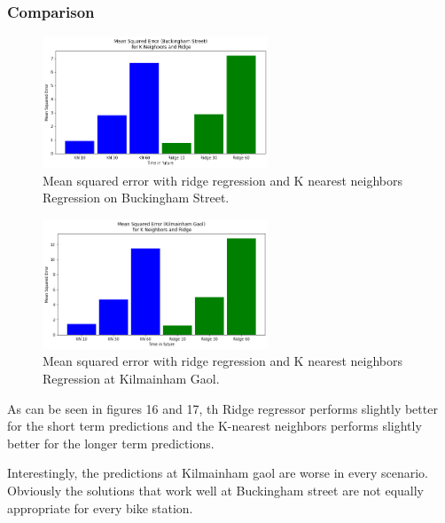 \subsubsection{Comparison}
\begin{figure}[H]
    \centering
    \includegraphics[width=0.6\textwidth]{images/mse5.png}
    \caption{Mean squared error with ridge regression and K nearest neighbors Regression  on Buckingham Street.}
    \end{figure}
\par

\begin{figure}[H]
    \centering
    \includegraphics[width=0.6\textwidth]{images/mse6.png}
    \caption{Mean squared error with ridge regression and K nearest neighbors Regression at Kilmainham Gaol.}
    \end{figure}
\par

As can be seen in figures 16 and 17, th Ridge regressor performs slightly better for the short term predictions and the K-nearest neighbors performs slightly better for the longer term predictions.

\par 
Interestingly, the predictions at Kilmainham gaol are worse in every scenario.
Obviously the solutions that work well at Buckingham street are not equally appropriate for every bike station.